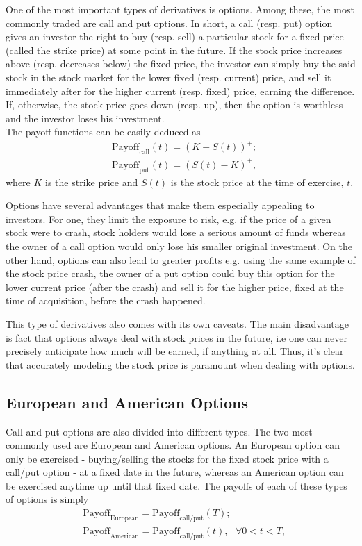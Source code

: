 \documentclass[a4paper,prd,twocolumn,nofootinbib,superscriptaddress,floatfix]{revtex4}
\begin{document}
One of the most important types of derivatives is options. Among these, the most commonly traded are call and put options. In short, a call (resp. put) option gives an investor the right to buy (resp. sell) a particular stock for a fixed price (called the strike price) at some point in the future. If the stock price increases above (resp. decreases below) the fixed price, the investor can simply buy the said stock in the stock market for the lower fixed (resp. current) price, and sell it immediately after for the higher current (resp. fixed) price, earning the difference. If, otherwise, the stock price goes down (resp. up), then the option is worthless and the investor loses his investment.\\
The payoff functions can be easily deduced as
\begin{equation}\label{callput}
\begin{split}
&\text{Payoff}_\text{call}(t)=(K-S(t))^+;\\
&\text{Payoff}_\text{put}(t)=(S(t)-K)^+,
\end{split}
\end{equation}
\noindent where $K$ is the strike price and $S(t)$ is the stock price at the time of exercise, $t$.

Options have several advantages that make them especially appealing to investors. For one, they limit the exposure to risk, e.g. if the price of a given stock were to crash, stock holders would lose a serious amount of funds whereas the owner of a call option would only lose his smaller original investment. On the other hand, options can also lead to greater profits e.g. using the same example of the stock price crash, the owner of a put option could buy this option for the lower current price (after the crash) and sell it for the higher price, fixed at the time of acquisition, before the crash happened.

This type of derivatives also comes with its own caveats. The main disadvantage is fact that options always deal with stock prices in the future, i.e one can never precisely anticipate how much will be earned, if anything at all. Thus, it's clear that accurately modeling the stock price is paramount when dealing with options.

\subsection{European and American Options}
Call and put options are also divided into different types. The two most commonly used are European and American options. An European option can only be exercised - buying/selling the stocks for the fixed stock price with a call/put option - at a fixed date in the future, whereas an American option can be exercised anytime up until that fixed date. The payoffs of each of these types of options is simply
\begin{equation}
\begin{split}
&\text{Payoff}_\text{European}=\text{Payoff}_\text{call/put}(T);\\
&\text{Payoff}_\text{American}=\text{Payoff}_\text{call/put}(t), \ \ \ \forall 0<t<T,
\end{split}
\end{equation}
\end{document}
